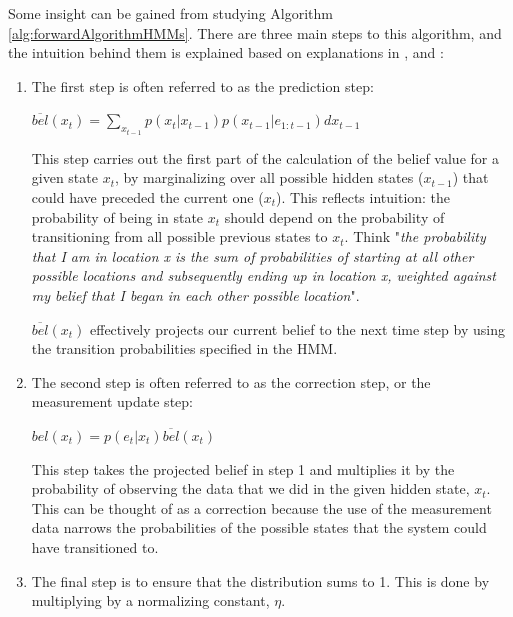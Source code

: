 Some insight can be gained from studying Algorithm \ref{alg:forwardAlgorithmHMMs}. There are three main steps to this algorithm, and the intuition behind them is explained based on explanations in \cite{AIAMA}, \cite{Thrun:2005:ProbabilisticRobotics} and \cite{Murphy1994DynamicLearning}: 
\begin{enumerate}
    
    \item The first step is often referred to as the prediction step:
    \begin{center}
    $\overline{bel}(x_t) = \sum_{x_{t-1}} p(x_t | x_{t-1}) p(x_{t-1} | e_{1:t-1}) d x_{t-1}$
    \end{center}

    This step carries out the first part of the calculation of the belief value for a given state $x_t$, by marginalizing over all possible hidden states ($x_{t-1}$) that could have preceded the current one ($x_t$). This reflects intuition: the probability of being in state $x_t$ should depend on the probability of transitioning from all possible previous states to $x_t$. 
    Think "\textit{the probability that I am in location x is the sum of probabilities of starting at all other possible locations and subsequently ending up in location x, weighted against my belief that I began in each other possible location}".
    
    $\overline{bel}(x_t)$ effectively projects our current belief to the next time step by using the transition probabilities specified in the HMM.
    
    \item The second step is often referred to as the correction step, or the measurement update step: 
    \begin{center}
    $bel(x_t) = p(e_t | x_t) \overline{bel}(x_t)$ 
    \end{center}
    This step takes the projected belief in step 1 and multiplies it by the probability of observing the data that we did in the given hidden state, $x_t$. This can be thought of as a correction because the use of the measurement data narrows the probabilities of the possible states that the system could have transitioned to. 
    
    \item The final step is to ensure that the distribution sums to 1. This is done by multiplying by a normalizing constant, $\eta$.
    
    
\end{enumerate}
